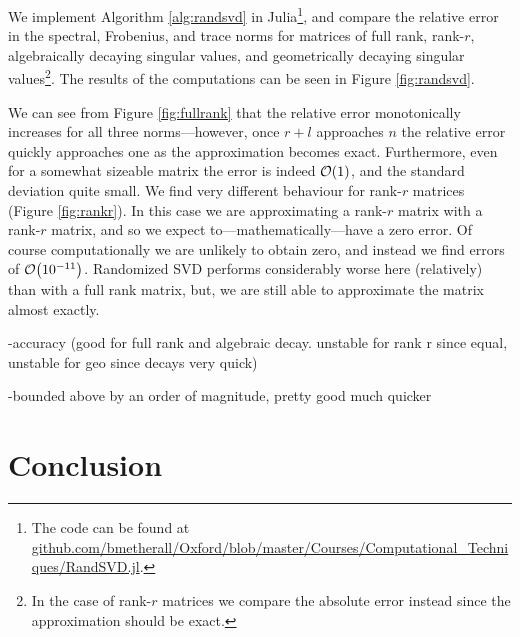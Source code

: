 \documentclass[11pt, a4paper, twocolumn]{article}
\let\originalleft\left
\let\originalright\right
\renewcommand{\left}{\mathopen{}\mathclose\bgroup\originalleft}
\renewcommand{\right}{\aftergroup\egroup\originalright}
\providecommand{\bigO}[1]{\ensuremath{\mathop{}\mathopen{}\mathcal{O}\mathopen{}\left(#1\right)}}
\begin{document}
We implement Algorithm \ref{alg:randsvd} in Julia\footnote{The code can be found at \url{github.com/bmetherall/Oxford/blob/master/Courses/Computational_Techniques/RandSVD.jl}.}, and compare the relative error in the spectral, Frobenius, and trace norms for matrices of full rank, rank-$r$, algebraically decaying singular values, and geometrically decaying singular values\footnote{In the case of rank-$r$ matrices we compare the absolute error instead since the approximation should be exact.}. The results of the computations can be seen in Figure \ref{fig:randsvd}.

We can see from Figure \ref{fig:fullrank} that the relative error monotonically increases for all three norms---however, once $r + l$ approaches $n$ the relative error quickly approaches one as the approximation becomes exact. Furthermore, even for a somewhat sizeable matrix the error is indeed $\bigO{1}$, and the standard deviation quite small. We find very different behaviour for rank-$r$ matrices (Figure \ref{fig:rankr}). In this case we are approximating a rank-$r$ matrix with a rank-$r$ matrix, and so we expect to---mathematically---have a zero error. Of course computationally we are unlikely to obtain zero, and instead we find errors of $\bigO{10^{-11}}$. Randomized SVD performs considerably worse here (relatively) than with a full rank matrix, but, we are still able to approximate the matrix almost exactly.


-accuracy (good for full rank and algebraic decay. unstable for rank r since equal, unstable for geo since decays very quick)

-bounded above by an order of magnitude, pretty good much quicker




\section{Conclusion}


\end{document}
